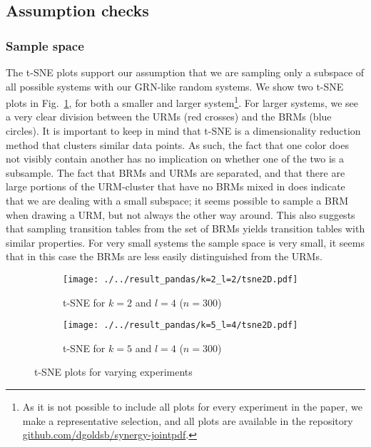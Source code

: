 \documentclass[../main.tex]{subfiles}
\begin{document}
\subsection{Assumption checks}

\subsubsection{Sample space}

The t-SNE plots support our assumption that we are sampling only a subspace of all possible systems with our GRN-like random systems.
We show two t-SNE plots in Fig.~\ref{fig:TSNE}, for both a smaller and larger system\footnote{As it is not possible to include all plots for every experiment in the paper, we make a representative selection, and all plots are available in the repository \url{github.com/dgoldsb/synergy-jointpdf}.}.
For larger systems, we see a very clear division between the URMs (red crosses) and the BRMs (blue circles).
It is important to keep in mind that t-SNE is a dimensionality reduction method that clusters similar data points.
As such, the fact that one color does not visibly contain another has no implication on whether one of the two is a subsample.
The fact that BRMs and URMs are separated, and that there are large portions of the URM-cluster that have no BRMs mixed in does indicate that we are dealing with a small subspace; it seems possible to sample a BRM when drawing a URM, but not always the other way around.
This also suggests that sampling transition tables from the set of BRMs yields transition tables with similar properties.
For very small systems the sample space is very small, it seems that in this case the BRMs are less easily distinguished from the URMs.

\begin{figure}[ht]
    \centering
    \begin{subfigure}[b]{0.48\textwidth}
        \texttt{[image: ./../result\_pandas/k=2\_l=2/tsne2D.pdf]}
        \caption{t-SNE for $k=2$ and $l=4$ ($n=300$)}
    \end{subfigure}
    \begin{subfigure}[b]{0.48\textwidth}
        \texttt{[image: ./../result\_pandas/k=5\_l=4/tsne2D.pdf]}
        \caption{t-SNE for $k=5$ and $l=4$ ($n=300$)}
    \end{subfigure}
    \caption{t-SNE plots for varying experiments}
    \label{fig:TSNE}
\end{figure}
\end{document}
